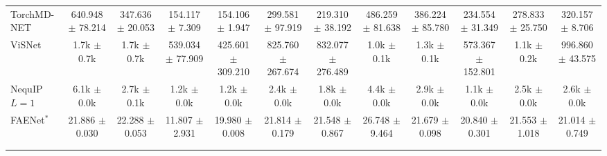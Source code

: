 \begin{table}[h]
{\begin{tabular}{lccccccccccc}
TorchMD-NET & 640.948 $\pm$ 78.214 & 347.636 $\pm$ 20.053 & 154.117 $\pm$ 7.309 & 154.106 $\pm$ 1.947 & 299.581 $\pm$ 97.919 & 219.310 $\pm$ 38.192 & 486.259 $\pm$ 81.638 & 386.224 $\pm$ 85.780 & 234.554 $\pm$ 31.349 & 278.833 $\pm$ 25.750 & 320.157 $\pm$ 8.706 \\
ViSNet & 1.7k $\pm$ 0.7k & 1.7k $\pm$ 0.7k & 539.034 $\pm$ 77.909 & 425.601 $\pm$ 309.210 & 825.760 $\pm$ 267.674 & 832.077 $\pm$ 276.489 & 1.0k $\pm$ 0.1k & 1.3k $\pm$ 0.1k & 573.367 $\pm$ 152.801 & 1.1k $\pm$ 0.2k & 996.860 $\pm$ 43.575 \\
NequIP $L{=}1$ & 6.1k $\pm$ 0.0k & 2.7k $\pm$ 0.1k & 1.2k $\pm$ 0.0k & 1.2k $\pm$ 0.0k & 2.4k $\pm$ 0.0k & 1.8k $\pm$ 0.0k & 4.4k $\pm$ 0.0k & 2.9k $\pm$ 0.0k & 1.1k $\pm$ 0.0k & 2.5k $\pm$ 0.0k & 2.6k $\pm$ 0.0k \\
FAENet$^{\ast}$ & 21.886 $\pm$ 0.030 & 22.288 $\pm$ 0.053 & 11.807 $\pm$ 2.931 & 19.980 $\pm$ 0.008 & 21.814 $\pm$ 0.179 & 21.548 $\pm$ 0.867 & 26.748 $\pm$ 9.464 & 21.679 $\pm$ 0.098 & 20.840 $\pm$ 0.301 & 21.553 $\pm$ 1.018 & 21.014 $\pm$ 0.749 \\
\midrule
\color{gray}{DimeNet++} & \color{gray}{1.2k $\pm$ 0.1k} & \color{gray}{991.164 $\pm$ 223.096} & \color{gray}{278.098 $\pm$ 49.866} & \color{gray}{389.387 $\pm$ 103.601} & \color{gray}{726.850 $\pm$ 80.483} & \color{gray}{608.244 $\pm$ 3.732} & \color{gray}{1.1k $\pm$ 0.1k} & \color{gray}{988.503 $\pm$ 107.070} & \color{gray}{519.458 $\pm$ 69.633} & \color{gray}{1.0k $\pm$ 0.1k} & \color{gray}{776.368 $\pm$ 11.972} \\
\color{gray}{SchNet} & \color{gray}{1.2k $\pm$ 0.1k} & \color{gray}{918.727 $\pm$ 33.117} & \color{gray}{196.534 $\pm$ 20.019} & \color{gray}{97.289 $\pm$ 13.538} & \color{gray}{226.752 $\pm$ 38.836} & \color{gray}{700.782 $\pm$ 58.526} & \color{gray}{1.4k $\pm$ 0.1k} & \color{gray}{1.2k $\pm$ 0.0k} & \color{gray}{627.706 $\pm$ 87.829} & \color{gray}{664.972 $\pm$ 35.163} & \color{gray}{720.170 $\pm$ 4.806} \\
\bottomrule
\end{tabular}%
}
 

\end{table}
